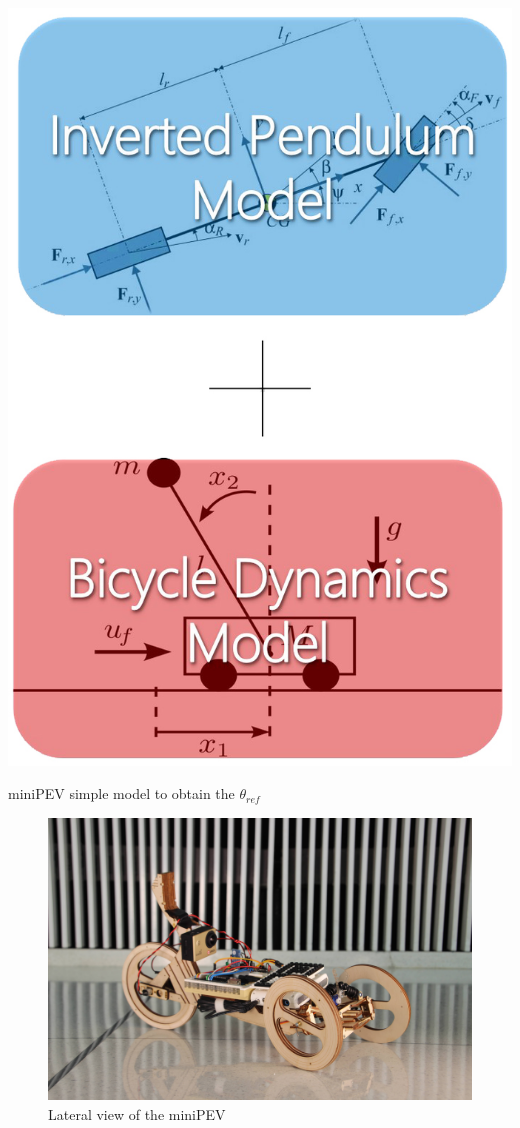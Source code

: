 \begin{marginfigure}[-3cm]
	\includegraphics[width=0.75\linewidth]{figs/04/Imagen2}
	\caption{miniPEV simple model to obtain the $\theta_{ref}$}
	\label{miniPEV_model}
\end{marginfigure}

\begin{figure}[h!]
	\includegraphics[width=1.0\linewidth]{figs/04/IMG0943}
	\caption{Lateral view of the miniPEV}
	\label{minipev1}
\end{figure}

